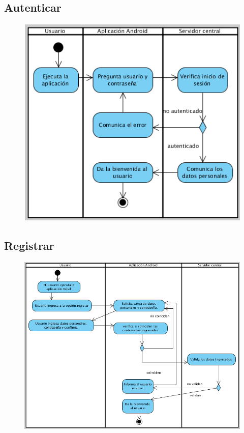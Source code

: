\subsection{Autenticar}
\begin{figure}[H]
  \centering
    \includegraphics{imagenes/analisis/diagrama-actividad-autenticar.png}
    \label{fig:diagrama-actividad-autenticar}
\end{figure}

\subsection{Registrar}

\begin{figure}[H]
  \centering
    \includegraphics[width=1\textwidth]{imagenes/analisis/diagrama-actividad-registrar.png}
	\label{fig:diagrama-actividad-registrar}
\end{figure}


